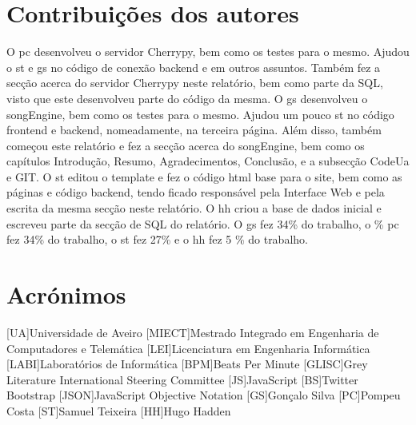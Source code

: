 \documentclass{report}
\begin{document}
\chapter*{Contribuições dos autores}
O \ac{pc} desenvolveu o servidor Cherrypy, bem como os testes para o mesmo. Ajudou o \ac{st} e \ac{gs} no código
de conexão backend e em outros assuntos. Também fez a secção acerca do servidor Cherrypy neste relatório, bem como
parte da SQL, visto que este desenvolveu parte do código da mesma.
O \ac{gs} desenvolveu o songEngine, bem como os testes para o mesmo. Ajudou um pouco \ac{st} no código frontend e backend,
nomeadamente, na terceira página. Além disso, também começou este relatório e fez a secção acerca do songEngine, bem como os
capítulos Introdução, Resumo, Agradecimentos, Conclusão, e a subsecção CodeUa e GIT. 
O \ac{st} editou o template e fez o código html base para o site, bem como as páginas e código backend, 
tendo ficado responsável pela Interface Web e pela escrita da mesma secção neste relatório.
O \ac{hh} criou a base de dados inicial e escreveu parte da secção de SQL do relatório.
O \ac{gs} fez 34\% do trabalho, o \% \ac{pc} fez 34\% do trabalho, o \ac{st} fez 27\% e o \ac{hh} fez 5 \% do trabalho.

\chapter*{Acrónimos}
\begin{acronym}
[UA]{Universidade de Aveiro}
[MIECT]{Mestrado Integrado em Engenharia de Computadores e Telemática}
[LEI]{Licenciatura em Engenharia Informática}
[LABI]{Laboratórios de Informática}
[BPM]{Beats Per Minute}
[GLISC]{Grey Literature International Steering Committee}
[JS]{JavaScript}
[BS]{Twitter Bootstrap}
[JSON]{JavaScript Objective Notation}
[GS]{Gonçalo Silva}
[PC]{Pompeu Costa}
[ST]{Samuel Teixeira}
[HH]{Hugo Hadden}
\end{acronym}


\printbibliography
\end{document}
